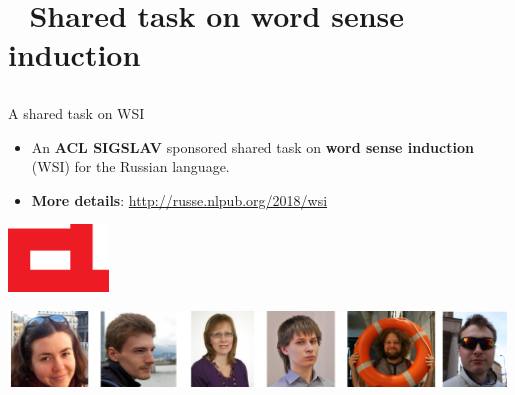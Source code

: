 \section{ $ $ $ $ Shared task on word sense induction}

\subsection{}

\begin{frame}{A shared task on WSI}
  
  \begin{itemize}
  \item An \textbf{\alert{ACL SIGSLAV}} sponsored shared task on \textbf{word sense induction} (WSI) for the Russian language.
 \end{itemize} 
  
  \begin{itemize}
    \item \textbf{More details}: \url{http://russe.nlpub.org/2018/wsi}
     
  \end{itemize}
  
  \begin{center}
  	\includegraphics[width=0.2\textwidth]{figures/acl}
  \end{center}
  
   \begin{center}
  	\includegraphics[width=0.99\textwidth]{figures/russe-team}
  \end{center}
\end{frame}



